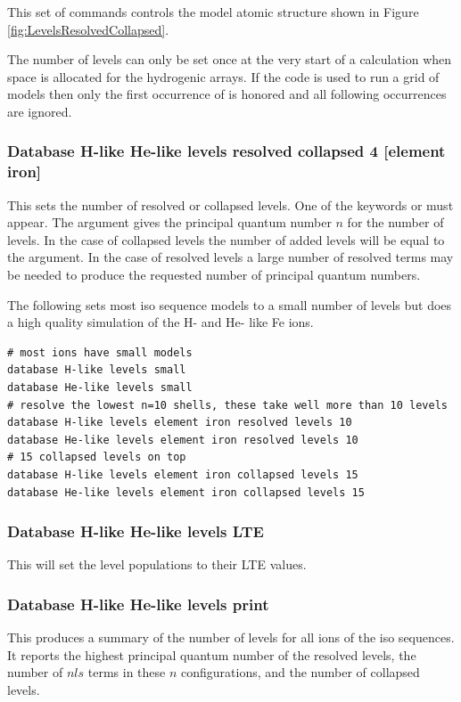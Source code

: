 This set of commands controls the model atomic structure shown in 
Figure \ref{fig:LevelsResolvedCollapsed}.

The number of levels can only be set once at the very start of a
calculation when space is allocated for the hydrogenic arrays.
If the code
is used to run a grid of models then only the first occurrence of
 is honored and all following occurrences
are ignored.

\subsubsection{Database H-like \OR{} He-like levels resolved \OR{} collapsed  4 [element iron]}

This sets the number of resolved or collapsed levels.
One of the keywords  or  must appear.
The argument gives the principal quantum
number $n$ for the number of levels.
In the case of collapsed levels the number of added levels will be equal to the argument.
In the case of resolved levels a large number of resolved terms may be needed
to produce the requested number of principal quantum numbers.

The following sets most iso sequence models to a small number of levels
but does a high quality simulation of the H- and He- like Fe ions.
\begin{verbatim}
# most ions have small models
database H-like levels small
database He-like levels small
# resolve the lowest n=10 shells, these take well more than 10 levels
database H-like levels element iron resolved levels 10
database He-like levels element iron resolved levels 10
# 15 collapsed levels on top
database H-like levels element iron collapsed levels 15
database He-like levels element iron collapsed levels 15
\end{verbatim}

\subsubsection{Database H-like \OR{} He-like levels LTE}

This will set the level populations to their LTE values.

\subsubsection{Database H-like \OR{} He-like levels print}

This produces a summary of the number of levels for all ions of the iso sequences.
It reports the highest principal quantum number of the resolved levels,
the number of $nls$ terms in these $n$ configurations,
and the number of collapsed levels.

